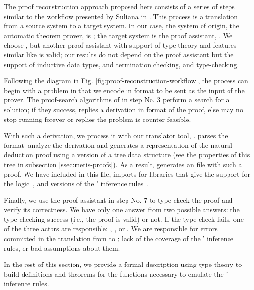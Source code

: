 \documentclass[../main.tex]{subfiles}
\begin{document}
The proof reconstruction approach proposed here consists of a series 
of steps similar to the workflow presented by Sultana in
\cite{sultana2015}. This process is a translation from a source 
system to a target system. In our case, the system of origin, the 
automatic theorem prover, is \Metis; the target system is the proof 
assistant, \Agda. We choose \Agda, but another proof assistant with 
support of type theory and features similar like \Agda is valid; our 
results do not depend on the proof assistant but the support of inductive data types, and termination checking, and type-checking.

Following the diagram in Fig.
\ref{fig:proof-reconstruction-workflow}, the process can begin with 
a problem in \CPL that we encode in \TPTP format to be sent as the 
input of the \Metis prover.
The proof-search algorithms of \Metis in step No. 3 perform a 
search for a solution; if they success, \Metis 
replies a derivation in \TSTP format of the proof, else \Metis may 
no stop running forever or replies the problem is counter feasible.

With such a derivation, we process it with our \Haskell translator 
tool, \Athena. \Athena parses the \TSTP format, analyze the 
derivation and generates a representation of the natural deduction 
proof using a version of a tree data structure (see the properties 
of this tree in subsection \ref{ssec:metis-proofs}). As a result,
\Athena generates an \Agda file with such a proof. We have included 
in this file, imports for \Agda libraries that give the support for 
the logic~\cite{AgdaProp}, and versions of the \Metis' inference 
rules~\cite{AgdaMetis}. 

Finally, we use the proof assistant in step No. 7 to type-check the 
proof and verify its correctness. We have only one answer from two 
possible answers: the type-checking success (i.e., the proof is 
valid) or not. If the type-check fails, one of the three actors are 
responsible: \Metis, \Athena, or \Agda. We are responsible for 
errors committed in the translation from \TSTP to \Agda; lack of the 
coverage of the \Metis' inference rules, or bad assumptions about 
them.

In the rest of this section, we provide a formal description using 
type theory to build definitions and theorems for the functions 
necessary to emulate the \Metis' inference rules. 
\end{document}
